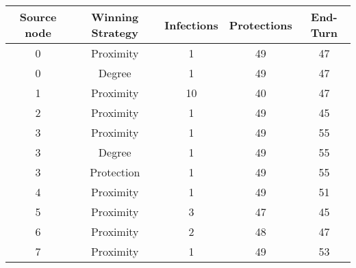 \documentclass[results.tex]{subfiles}
\begin{document}
    \begin{center}
        \begin{tabular}{| c || c | c | c | c |}
            \hline
            {\bfseries Source node} & {\bfseries Winning Strategy} & {\bfseries Infections} & {\bfseries Protections}
            & {\bfseries End-Turn}
            \\  %
            \hline\hline
            0                       & Proximity                    & 1                      & 49                      & 47                   \\
            \hline
            0                       & Degree                       & 1                      & 49                      & 47                   \\
            \hline
            1                       & Proximity                    & 10                     & 40                      & 47                   \\
            \hline
            2                       & Proximity                    & 1                      & 49                      & 45                   \\
            \hline
            3                       & Proximity                    & 1                      & 49                      & 55                   \\
            \hline
            3                       & Degree                       & 1                      & 49                      & 55                   \\
            \hline
            3                       & Protection                   & 1                      & 49                      & 55                   \\
            \hline
            4                       & Proximity                    & 1                      & 49                      & 51                   \\
            \hline
            5                       & Proximity                    & 3                      & 47                      & 45                   \\
            \hline
            6                       & Proximity                    & 2                      & 48                      & 47                   \\
            \hline
            7                       & Proximity                    & 1                      & 49                      & 53                   \\

\end{tabular}
\end{center}
\end{document}
